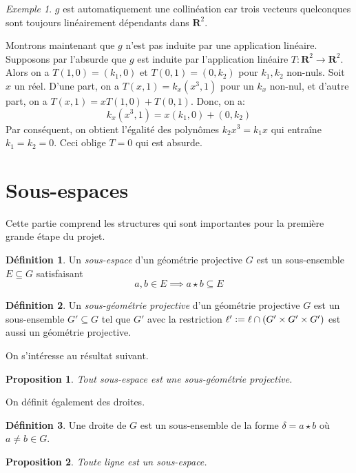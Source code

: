 \documentclass[10pt]{memoir}
\newtheorem{prop}{Proposition}
\theoremstyle{definition}
\newtheorem{defn}{Définition}
\theoremstyle{remark}
\newtheorem{exm}{Exemple}
\newcommand{\defeq}{\vcentcolon=}
\newcommand{\R}{\mathbf{R}}
\begin{document}
\begin{exm}
  $g$ est automatiquement une collinéation car trois vecteurs quelconques sont
  toujours linéairement dépendants dans $\R^2$.

  Montrons maintenant que $g$ n'est pas induite par une application linéaire.
  Supposons par l'absurde que $g$ est induite par l'application linéaire
  $T : \R^{2} \to \R^{2}$. Alors on a $T(1, 0) = (k_{1}, 0)$ et
  $T(0, 1) = (0, k_{2})$ pour $k_{1}, k_{2}$ non-nuls. Soit $x$ un réel.
  D'une part, on a $T(x, 1) = k_{x} (x^{3}, 1)$ pour un $k_{x}$ non-nul, et
  d'autre part, on a $T(x, 1) = x T(1, 0) + T(0, 1)$. Donc, on a:
  $$
  k_{x} (x^{3}, 1) = x (k_{1}, 0) + (0, k_{2})
  $$
  Par conséquent, on obtient l'égalité des polynômes $k_{2}x^{3} = k_{1}x$ qui
  entraîne $k_{1} = k_{2} = 0$. Ceci oblige $T = 0$ qui est absurde.
\end{exm}
\section{Sous-espaces}
Cette partie comprend les structures qui sont importantes pour la
première grande étape du projet.
\begin{defn}
  Un \textit{sous-espace} d'un géométrie projective $G$ est un
  sous-ensemble $E \subseteq G$ satisfaisant
  $$
  a, b \in E \implies a \star b \subseteq E
  $$
\end{defn}
\begin{defn}
  Un \textit{sous-géométrie projective} d'un géométrie projective $G$ est
  un sous-ensemble $G' \subseteq G$ tel que $G'$ avec la restriction
  $\ell' \defeq \ell \cap (G' \times G' \times G')$ est aussi un
  géométrie projective.
\end{defn}
On s'intéresse au résultat suivant.
\begin{prop}
Tout sous-espace est une sous-géométrie projective.
\end{prop}
On définit également des droites.
\begin{defn}
  Une droite de $G$ est un sous-ensemble de la forme $\delta = a \star
  b$ où $a \neq b \in G$.
\end{defn}
\begin{prop}
  Toute ligne est un sous-espace.
\end{prop}
\end{document}
